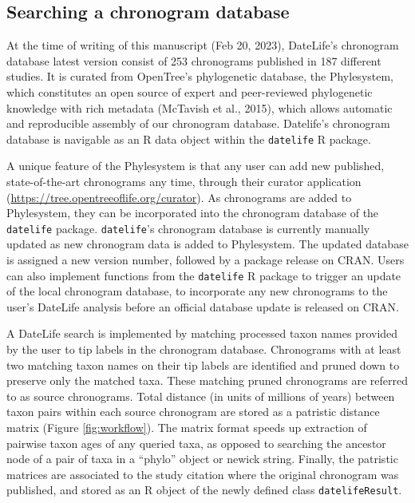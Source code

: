 \documentclass[english,man]{apa6}
\begin{document}
\hypertarget{searching-a-chronogram-database}{%
\subsection{Searching a chronogram database}\label{searching-a-chronogram-database}}

At the time of writing of this manuscript
(Feb 20, 2023),
DateLife's chronogram database latest version consist of 253 chronograms published in 187 different studies. It is curated from OpenTree's phylogenetic database, the Phylesystem, which constitutes an open source of expert and peer-reviewed phylogenetic knowledge with rich metadata (McTavish et al., 2015), which allows automatic and reproducible assembly of our chronogram database. Datelife's chronogram database is navigable as an R data object within the \texttt{datelife} R package.

A unique feature of the Phylesystem is that any user can add new published, state-of-the-art chronograms any time, through their curator application (\url{https://tree.opentreeoflife.org/curator}). As chronograms are added to Phylesystem, they can be incorporated into the chronogram database of the \texttt{datelife} package. \texttt{datelife}'s chronogram database is currently manually updated as new chronogram data is added to Phylesystem. The updated database is assigned a new version number, followed by a package release on CRAN.
Users can also implement functions from the \texttt{datelife} R package to trigger an update of the local chronogram database, to incorporate any new chronograms to the user's DateLife analysis before an official database update is released on CRAN.

A DateLife search is implemented by matching processed taxon names provided by the user to tip labels in the chronogram database. Chronograms with at least two matching taxon names on their tip labels are identified and pruned down to preserve only the matched taxa.
These matching pruned chronograms are referred to as source chronograms.
Total distance (in units of millions of years) between taxon pairs within each source chronogram are stored as a patristic distance matrix (Figure \ref{fig:workflow}).
The matrix format speeds up extraction of pairwise taxon ages of any queried taxa, as opposed to searching the ancestor node of a pair of taxa in a \enquote{phylo} object or newick string.
Finally, the patristic matrices are associated to the study citation where the original chronogram was published, and stored as an R object of the newly defined class \texttt{datelifeResult}.
\end{document}
